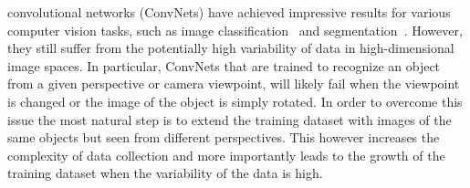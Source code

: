 \documentclass[10pt,journal,compsoc]{IEEEtran}
\begin{document}
	\IEEEpeerreviewmaketitle




	 convolutional networks (ConvNets) have achieved impressive results for various computer vision tasks, such as image classification~\cite{bb:krizhevsky2012imagenetNIPS2012} and segmentation~\cite{bb:seg}. However, they still suffer from the potentially high variability of data in high-dimensional image spaces. In particular, ConvNets that are trained to recognize an object from a given perspective or camera viewpoint, will likely fail when the viewpoint is changed or the image of the object is simply rotated. In order to overcome this issue the most natural step is to extend the training dataset with images of the same objects but seen from different perspectives. This however increases the complexity of data collection and more importantly leads to the growth of the training dataset when the variability of the data is high.
\end{document}
